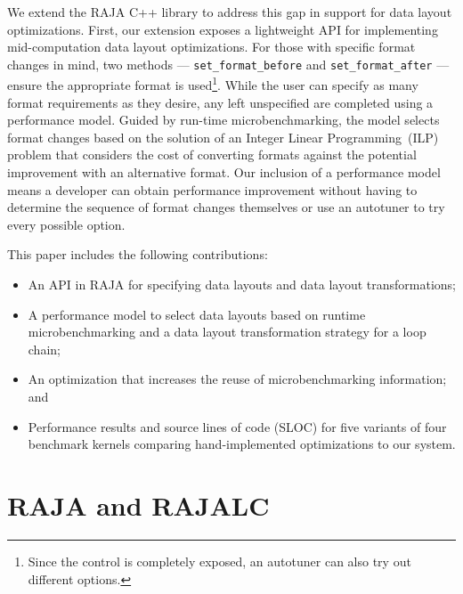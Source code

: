 \documentclass[sigconf,review=true]{acmart}
\begin{document}
We extend the RAJA C++ library to address this gap in support for data layout optimizations.
First, our extension exposes a lightweight API for implementing mid-computation data layout optimizations.
For those with specific format changes in mind, two methods --- \verb.set_format_before. and \verb.set_format_after. --- ensure the appropriate format is used\footnote{Since the control is completely exposed, an autotuner can also try out different options.}.
While the user can specify as many format requirements as they desire, any left unspecified are completed using a performance model.
Guided by run-time microbenchmarking, the model selects format changes based on the solution of an Integer Linear Programming~(ILP) problem that considers the cost of converting formats against the potential improvement with an alternative format.
Our inclusion of a performance model means a developer can obtain performance improvement without having to determine the sequence of format changes themselves or use an autotuner to try every possible option.

This paper includes the following contributions:
\begin{itemize}
\item An API in RAJA for specifying data layouts and data layout transformations;
\item A performance model to select data layouts based on runtime microbenchmarking and a data layout transformation strategy for a loop chain;
\item An optimization that increases the reuse of microbenchmarking information; and
\item Performance results and source lines of code (SLOC) for five variants of four benchmark kernels comparing hand-implemented optimizations to our system.
\end{itemize} 


\section{RAJA and RAJALC}
\end{document}
